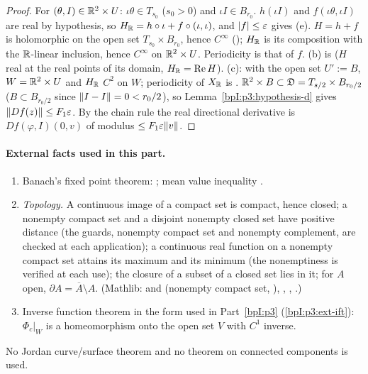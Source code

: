 \begin{proof}
\label{stepI:p5:rh-values} For $(\theta,I)\in\mathbb{R}^2\times U$: $\iota\theta\in T_{s_0}$ ($s_0>0$) and $\iota I\in B_{r_0}$. $h(\iota I)$ and $f(\iota\theta,\iota I)$ are real by hypothesis, so $H_{\mathbb{R}}=h\circ\iota+f\circ(\iota,\iota)$, and $\lvert f\rvert\le\varepsilon$ gives (e).
\label{stepI:p5:rh-smooth} $H=h+f$ is holomorphic on the open set $T_{s_0}\times B_{r_0}$, hence $C^\infty$ (); $H_{\mathbb{R}}$ is its composition with the $\mathbb{R}$-linear inclusion, hence $C^\infty$ on $\mathbb{R}^2\times U$. Periodicity is that of $f$.
\label{stepI:p5:rh-field} (b) is  ($H$ real at the real points of its domain, $H_{\mathbb{R}}=\operatorname{Re}H$). (c):  with the open set $U':=B$, $W=\mathbb{R}^2\times U$ and $H_{\mathbb{R}}$ $C^2$ on $W$; periodicity of $X_{\mathbb{R}}$ is .
\label{stepI:p5:rh-deriv} $\mathbb{R}^2\times B\subset\mathfrak D=T_{s/2}\times B_{r_0/2}$ ($B\subset B_{r_0/2}$ since $\lVert I-I\rVert=0<r_0/2$), so Lemma~\ref{bpI:p3:hypothesis-d} gives $\lVert Df(z)\rVert\le F_1\varepsilon$. By the chain rule the real directional derivative is $Df(\varphi,I)(0,v)$ of modulus $\le F_1\varepsilon\lVert v\rVert$.
\end{proof}

\paragraph{External facts used in this part.}
\begin{enumerate}[label=(Z\arabic*),ref=(Z\arabic*)]
\item\label{bpI:p5:ext-banach} Banach's fixed point theorem: ; mean value inequality .
\item\label{bpI:p5:ext-top} \emph{Topology.} A continuous image of a compact set is compact, hence closed; a nonempty compact set and a disjoint nonempty closed set have positive distance (the guards, nonempty compact set and nonempty complement, are checked at each application); a continuous real function on a nonempty compact set attains its maximum and its minimum (the nonemptiness is verified at each use);
the closure of a subset of a closed set lies in it; for $A$ open, $\partial A=\overline A\setminus A$. (Mathlib:  and  (nonempty compact set, ), , , .)
\item\label{bpI:p5:ext-ift} Inverse function theorem in the form used in Part~\ref{bpI:p3} (\ref{bpI:p3:ext-ift}): $\Phi_c|_W$ is a homeomorphism onto the open set $V$ with $C^1$ inverse.
\end{enumerate}
No Jordan curve/surface theorem and no theorem on connected components is used.

